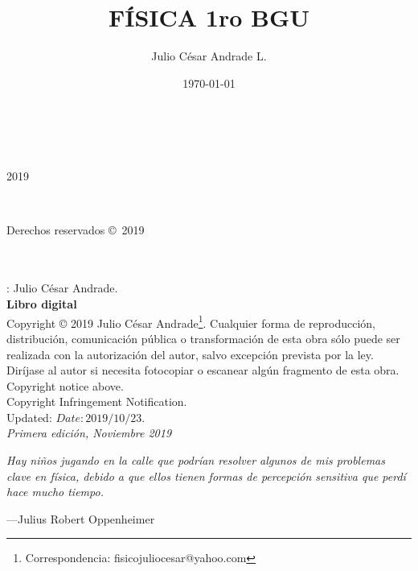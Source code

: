 \documentclass[a5paper,pagesize,10pt,bibtotoc,pointlessnumbers,
normalheadings,DIV=9,fleqn,x11names,table,twoside=false]{scrbook}
\title{FÍSICA 1ro BGU}
\author{Julio César Andrade L.}
\date{\today}
\begin{document}
%

\BgThispage
\begin{titlepage}
		\\
			
		\vspace{10mm}
		\\
		\vspace{\fill}
		\centering \large{2019}
\end{titlepage}


\newpage
~\vfill
\thispagestyle{empty}
\cleardoublepage

\noindent 
\parbox[s]{0.35\textwidth}{Derechos reservados \copyright\ 2019}\parbox[c]{0.65\textwidth}{
 \color{gray}
 } \\\\  
 
: Julio César Andrade.\\
\noindent \textbf{Libro digital}\\

\noindent  Copyright © 2019 Julio César Andrade\footnote{Correspondencia: fisicojuliocesar@yahoo.com}. 
Cualquier forma de reproducción, distribución, comunicación pública o transformación de esta obra sólo puede ser realizada con  la 
 autorización  del autor,  salvo  excepción  prevista  por  la  ley.  Diríjase  al autor si  necesita  fotocopiar  o  escanear 
algún fragmento de esta obra.\\

Copyright notice above.\\

Copyright Infringement Notification.\\

Updated: $Date: 2019/10/23$.\\

\noindent \textit{Primera edición, Noviembre 2019} 


\newpage{}
\thispagestyle {empty}

\vspace*{2cm}

\begin{center}
	\Large{\parbox{10cm}{
		\begin{raggedright}
		{\Large 
			\textit{Hay niños jugando en la calle que podrían resolver algunos de mis problemas clave en física, 
			debido a que ellos tienen formas de percepción sensitiva que perdí hace mucho tiempo.}
		}
	
		\vspace{.5cm}\hfill{---Julius Robert Oppenheimer}
		\end{raggedright}
	}
}
\end{center}
\end{document}
